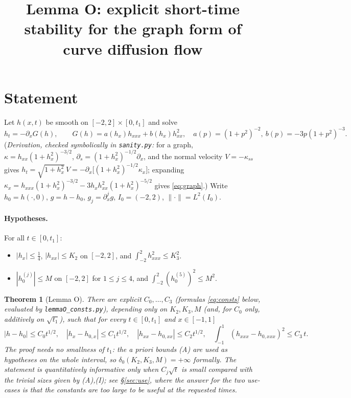 \documentclass[11pt]{article}
\title{Lemma O: explicit short-time stability for the graph form of curve diffusion flow}
\author{}\date{}
\newtheorem{theorem}{Theorem}
\theoremstyle{remark}\newtheorem{remark}[theorem]{Remark}
\newcommand{\nrm}[1]{\lVert #1\rVert}
\begin{document}
\maketitle

\section{Statement}
Let $h(x,t)$ be smooth on $[-2,2]\times[0,t_1]$ and solve
\begin{equation}\label{eq:graph}
h_t=-\partial_x G(h),\qquad G(h)=a(h_x)h_{xxx}+b(h_x)h_{xx}^2,\quad a(p)=(1+p^2)^{-2},\ b(p)=-3p(1+p^2)^{-3}.
\end{equation}
(\emph{Derivation, checked symbolically in \texttt{sanity.py}:} for a graph, $\kappa=h_{xx}(1+h_x^2)^{-3/2}$, $\partial_s=(1+h_x^2)^{-1/2}\partial_x$, and the normal velocity $V=-\kappa_{ss}$ gives $h_t=\sqrt{1+h_x^2}\,V=-\partial_x\big[(1+h_x^2)^{-1/2}\kappa_x\big]$; expanding $\kappa_x=h_{xxx}(1+h_x^2)^{-3/2}-3h_xh_{xx}^2(1+h_x^2)^{-5/2}$ gives \eqref{eq:graph}.)
Write $h_0=h(\cdot,0)$, $g=h-h_0$, $g_j=\partial_x^jg$, $I_0=(-2,2)$, $\nrm{\cdot}=L^2(I_0)$.

\paragraph{Hypotheses.} For all $t\in[0,t_1]$:
\begin{itemize}
\item[(A)] $|h_x|\le\frac14$, $|h_{xx}|\le K_2$ on $[-2,2]$, and $\int_{-2}^2h_{xxx}^2\le K_3^2$.
\item[(I)] $|h_0^{(j)}|\le M$ on $[-2,2]$ for $1\le j\le4$, and $\int_{-2}^2(h_0^{(5)})^2\le M^2$.
\end{itemize}

\begin{theorem}[Lemma O]\label{thm:O}
There are explicit $C_0,\dots,C_3$ (formulas \eqref{eq:consts} below, evaluated by \texttt{lemmaO\_consts.py}), depending only on $K_2,K_3,M$ (and, for $C_0$ only, additively on $\sqrt{t_1}$), such that for every $t\in[0,t_1]$ and $x\in[-1,1]$
\[
|h-h_0|\le C_0t^{1/2},\quad |h_x-h_{0,x}|\le C_1t^{1/2},\quad |h_{xx}-h_{0,xx}|\le C_2t^{1/2},\quad \int_{-1}^1(h_{xxx}-h_{0,xxx})^2\le C_3\,t .
\]
The proof needs \emph{no} smallness of $t_1$: the a priori bounds (A) are used as hypotheses on the whole interval, so $\delta_0(K_2,K_3,M)=+\infty$ formally. The statement is quantitatively informative only when $C_j\sqrt t$ is small compared with the trivial sizes given by (A),(I); see \S\ref{sec:use}, where the answer for the two use-cases is that the constants are \emph{too large} to be useful at the requested times.
\end{theorem}
\end{document}
